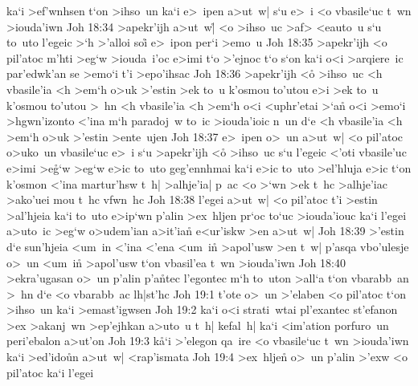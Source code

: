 ka`i
>ef'wnhsen
t`on
>ihso~un
ka`i
e>~ipen
a>ut~w|
s`u
e>~i
<o
vbasile`uc
t~wn
>iouda'iwn\bibvsend
\vs Joh 18:34
>apekr'ijh
a>ut~w|\r{}
<o
>ihso~uc
>af>
<eauto~u
s`u
to~uto
l'egeic
>`h
>'alloi
soi\r{}
e>~ipon
per`i
>emo~u\bibvsend
\vs Joh 18:35
>apekr'ijh
<o
pil'atoc
m'hti
>eg`w
>iouda~i'oc
e>imi
t`o
>'ejnoc
t`o
s`on
ka`i
o<i
>arqiere~ic
par'edwk'an
se
>emo`i
t'i
>epo'ihsac\bibvsend
\vs Joh 18:36
>apekr'ijh
<o\r{}
>ihso~uc
<h
vbasile'ia
<h
>em`h
o>uk
>'estin
>ek
to~u
k'osmou
to'utou
e>i
>ek
to~u
k'osmou
to'utou
>~hn
<h
vbasile'ia
<h
>em`h
o<i
<uphr'etai
>`an\r{}
o<i
>emo`i
>hgwn'izonto
<'ina
m`h
paradoj~w
to~ic
>iouda'ioic
n~un
d`e
<h
vbasile'ia
<h
>em`h
o>uk
>'estin
>ente~ujen\bibvsend
\vs Joh 18:37
e>~ipen
o>~un
a>ut~w|
<o
pil'atoc
o>uko~un
vbasile`uc
e>~i
s`u
>apekr'ijh
<o\r{}
>ihso~uc
s`u
l'egeic
<'oti
vbasile'uc
e>imi
>e\r{g}`w
>eg`w
e>ic
to~uto
geg'ennhmai
ka`i
e>ic
to~uto
>el'hluja
e>ic
t`on
k'osmon
<'ina
martur'hsw
t~h|
>alhje'ia|
p~ac
<o
>`wn
>ek
t~hc
>alhje'iac
>ako'uei
mou
t~hc
vfwn~hc\bibvsend
\vs Joh 18:38
l'egei
a>ut~w|
<o
pil'atoc
t'i
>estin
>al'hjeia
ka`i
to~uto
e>ip`wn
p'alin
>ex~hljen
pr`oc
to`uc
>iouda'iouc
ka`i
l'egei
a>uto~ic
>eg`w
o>udem'ian
a>it'ian\r{}
e<ur'iskw
>en
a>ut~w|\bibvsend
\vs Joh 18:39
>'estin
d`e
sun'hjeia
<um~in
<'ina
<'ena
<um~in\r{}
>apol'usw
>en
t~w|
p'asqa
vbo'ulesje
o>~un
<um~in\r{}
>apol'usw
t`on
vbasil'ea
t~wn
>iouda'iwn\bibvsend
\vs Joh 18:40
>ekra'ugasan
o>~un
p'alin
p'a\r{n}tec
l'egontec
m`h
to~uton
>all`a
t`on
vbarabb~an
>~hn
d`e
<o
vbarabb~ac
lh|st'hc\bibvsend
\vs Joh 19:1
t'ote
o>~un
>'elaben
<o
pil'atoc
t`on
>ihso~un
ka`i
>emast'igwsen\bibvsend
\vs Joh 19:2
ka`i
o<i
strati~wtai
pl'exantec
st'efanon
>ex
>akanj~wn
>ep'ejhkan
a>uto~u
t~h|
kefal~h|
ka`i
<im'ation
porfuro~un
peri'ebalon
a>ut'on\bibvsend
\vs Joh 19:3
k\r{a}`i
>'elegon
qa~ire
<o
vbasile`uc
t~wn
>iouda'iwn
ka`i
>ed'ido\r{u}n
a>ut~w|
<rap'ismata\bibvsend
\vs Joh 19:4
>ex~hljen\r{}
o>~un
p'alin
>'exw
<o
pil'atoc
ka`i
l'egei
